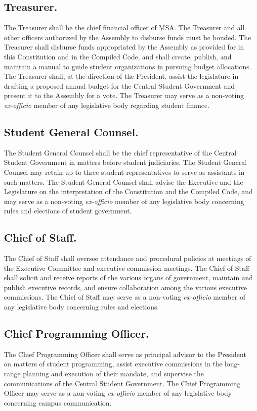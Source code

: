 \subsection{Treasurer.}
The Treasurer shall be the chief financial officer of MSA. The Treasurer and all other officers authorized by the Assembly to disburse funds must be bonded. The Treasurer shall disburse funds appropriated by the Assembly as provided for in this Constitution and in the Compiled Code, and shall create, publish, and maintain a manual to guide student organizations in pursuing budget allocations. The Treasurer shall, at the direction of the President, assist the legislature in drafting a proposed annual budget for the Central Student Government and present it to the Assembly for a vote. The Treasurer may serve as a non-voting \textit{ex-officio} member of any legislative body regarding student finance.

\subsection{Student General Counsel.}
The Student General Counsel shall be the chief representative of the Central Student Government in matters before student judiciaries. The Student General Counsel may retain up to three student representatives to serve as assistants in such matters. The Student General Counsel shall advise the Executive and the Legislature on the interpretation of the Constitution and the Compiled Code, and may serve as a non-voting \textit{ex-officio} member of any legislative body concerning rules and elections of student government.

\subsection{Chief of Staff.}
The Chief of Staff shall oversee attendance and procedural policies at meetings of the Executive Committee and executive commission meetings. The Chief of Staff shall solicit and receive reports of the various organs of government, maintain and publish executive records, and ensure collaboration among the various executive commissions. The Chief of Staff may serve as a non-voting \textit{ex-officio} member of any legislative body concerning rules and elections.

\subsection{Chief Programming Officer.}
The Chief Programming Officer shall serve as principal advisor to the President on matters of student programming, assist executive commissions in the long-range planning and execution of their mandate, and supervise the communications of the Central Student Government. The Chief Programming Officer may serve as a non-voting \textit{ex-officio} member of any legislative body concerning campus communication.


